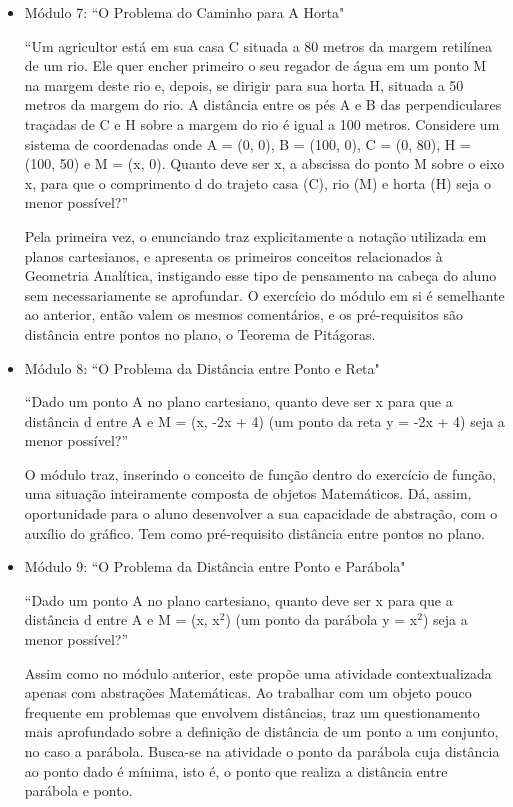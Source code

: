 \begin{itemize}
    \item Módulo 7: ``O Problema do Caminho para A Horta"
    
    ``Um agricultor está em sua casa C situada a 80 metros da margem retilínea de um rio. Ele quer encher primeiro o seu regador de água em um ponto M na margem deste rio e, depois, se dirigir para sua horta H, situada a 50 metros da margem do rio. A distância entre os pés A e B das perpendiculares traçadas de C e H sobre a margem do rio é igual a 100 metros. Considere um sistema de coordenadas onde A = (0, 0), B = (100, 0), C = (0, 80), H = (100, 50) e M = (x, 0). Quanto deve ser x, a abscissa do ponto M sobre o eixo x, para que o comprimento d do trajeto casa (C), rio (M) e horta (H) seja o menor possível?”
    
    Pela primeira vez, o enunciando traz explicitamente a notação utilizada em planos cartesianos, e apresenta os primeiros conceitos relacionados à Geometria Analítica, instigando esse tipo de pensamento na cabeça do aluno sem necessariamente se aprofundar. O exercício do módulo em si é semelhante ao anterior, então valem os mesmos comentários, e os pré-requisitos são distância entre pontos no plano, o Teorema de Pitágoras.
    
    \item Módulo 8: ``O Problema da Distância entre Ponto e Reta"
    
    ``Dado um ponto A no plano cartesiano, quanto deve ser x para que a distância d entre A e M = (x, -2x + 4) (um ponto da reta y = -2x + 4) seja a menor possível?”
    
    O módulo traz, inserindo o conceito de função dentro do exercício de função, uma situação inteiramente composta de objetos Matemáticos. Dá, assim, oportunidade para o aluno desenvolver a sua capacidade de abstração, com o auxílio do gráfico. Tem como pré-requisito distância entre pontos no plano.
    
    \item Módulo 9: ``O Problema da Distância entre Ponto e Parábola"

    ``Dado um ponto A no plano cartesiano, quanto deve ser x para que a distância d entre A e M = (x, x$^2$) (um ponto da parábola y = x$^2$) seja a menor possível?”
    
    Assim como no módulo anterior, este propõe uma atividade contextualizada apenas com abstrações Matemáticas. Ao trabalhar com um objeto pouco frequente em problemas que envolvem distâncias, traz um questionamento mais aprofundado sobre a definição de distância de um ponto a um conjunto, no caso a parábola. Busca-se na atividade o ponto da parábola cuja distância ao ponto dado é mínima, isto é, o ponto que realiza a distância entre parábola e ponto.
    

\end{itemize}
